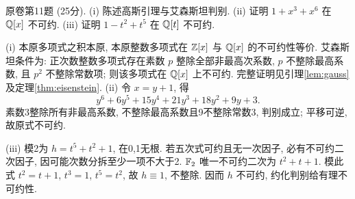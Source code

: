 \begin{exercise}原卷第11题 (25分). (i) 陈述高斯引理与艾森斯坦判别. (ii) 证明 $1+x^3+x^6$ 在 $\mathbb Q[x]$ 不可约. (iii) 证明 $1-t^2+t^5$ 在 $\mathbb Q[t]$ 不可约.\end{exercise}
\begin{solution}
(i) 本原多项式之积本原, 本原整数多项式在 $\mathbb Z[x]$ 与 $\mathbb Q[x]$ 的不可约性等价. 艾森斯坦条件为: 正次数整数多项式存在素数 $p$ 整除全部非最高次系数, $p$ 不整除最高系数, 且 $p^2$ 不整除常数项; 则该多项式在 $\mathbb Q[x]$ 上不可约. 完整证明见引理\ref{lem:gauss}及定理\ref{thm:eisenstein}. (ii) 令 $x=y+1$, 得
\[
y^6+6y^5+15y^4+21y^3+18y^2+9y+3.
\]
素数3整除所有非最高系数, 不整除最高系数且9不整除常数3, 判别成立; 平移可逆, 故原式不可约.

(iii) 模2为 $h=t^5+t^2+1$, 在0,1无根. 若五次式可约且无一次因子, 必有不可约二次因子, 因可能次数分拆至少一项不大于2. $\mathbb F_2$ 唯一不可约二次为 $t^2+t+1$. 模此式 $t^2=t+1$, $t^3=1$, $t^5=t^2$, 故 $h\equiv1$, 不整除. 因而 $h$ 不可约, 约化判别给有理不可约性.
\end{solution}
